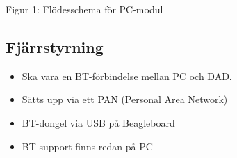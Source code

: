 	\centerline{Figur 1: Flödesschema för PC-modul}
	\centerline{} %
	\centerline{}
	\pagebreak	
	
	\subsection{Fjärrstyrning}
	\begin{itemize}
		\item Ska vara en BT-förbindelse mellan PC och DAD.
		\item Sätts upp via ett PAN (Personal Area Network)
		\item BT-dongel via USB på Beagleboard
		\item BT-support finns redan på PC
	\end{itemize}
%